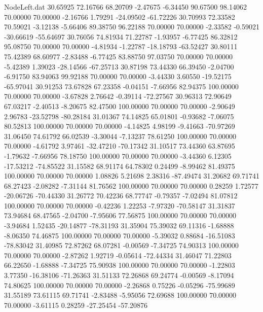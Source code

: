 \begin{filecontents}{NodeLeft.dat}
  30.65925   72.16766   68.20709    -2.47675   -6.34450   90.67500   98.14062   70.00000   70.00000   -2.16766    1.79291  -24.09502  -61.72226
  30.70993   72.33582   70.59021    -3.12138   -5.66406   89.38750   96.22188   70.00000   70.00000   -2.33582   -0.59021  -30.66619  -55.64697
  30.76056   74.81934   71.22787    -1.93957   -6.77425   86.32812   95.08750   70.00000   70.00000   -4.81934   -1.22787  -18.18793  -63.52427
  30.80111   75.42389   68.60977    -2.83488   -6.77425   83.88750   97.03750   70.00000   70.00000   -5.42389    1.39023  -28.14566  -67.25713
  30.87198   73.44330   66.39450    -2.04700   -6.91750   83.94063   99.92188   70.00000   70.00000   -3.44330    3.60550  -19.52175  -65.97041
  30.91253   73.67828   67.23358    -0.04151   -7.66956   82.94375  100.00000   70.00000   70.00000   -3.67828    2.76642   -0.39114  -72.27567
  30.96313   72.90649   67.03217    -2.40513   -8.20675   82.47500  100.00000   70.00000   70.00000   -2.90649    2.96783  -23.52798  -80.28184
  31.01367   74.14825   65.01801    -0.93682   -7.06075   80.52813  100.00000   70.00000   70.00000   -4.14825    4.98199   -9.41663  -70.97269
  31.06450   74.61792   66.02539    -3.30044   -7.13237   78.61250  100.00000   70.00000   70.00000   -4.61792    3.97461  -32.47210  -70.17342
  31.10517   73.44360   63.87695    -1.79632   -7.66956   78.18750  100.00000   70.00000   70.00000   -3.44360    6.12305  -17.53212  -74.85522
  31.15582   68.91174   64.78302     0.24499   -8.99462   81.49375  100.00000   70.00000   70.00000    1.08826    5.21698    2.38316  -87.49474
  31.20682   69.71741   68.27423    -2.08282   -7.31144   81.76562  100.00000   70.00000   70.00000    0.28259    1.72577  -20.06726  -70.44330
  31.26772   70.42236   68.77747    -0.79357   -7.02494   81.07812  100.00000   70.00000   70.00000   -0.42236    1.22253   -7.97320  -70.58147
  31.31837   73.94684   68.47565    -2.04700   -7.95606   77.56875  100.00000   70.00000   70.00000   -3.94684    1.52435  -20.14877  -78.31193
  31.35904   75.39032   69.11316    -1.68888   -8.06350   74.46875  100.00000   70.00000   70.00000   -5.39032    0.88684  -16.51083  -78.83042
  31.40985   72.87262   68.07281    -0.00569   -7.34725   74.90313  100.00000   70.00000   70.00000   -2.87262    1.92719   -0.05614  -72.44334
  31.46047   71.22803   66.22650    -1.68888   -7.34725   75.90938  100.00000   70.00000   70.00000   -1.22803    3.77350  -16.38106  -71.26363
  31.51133   72.26868   69.24774    -0.00569   -8.17094   74.80625  100.00000   70.00000   70.00000   -2.26868    0.75226   -0.05296  -75.99689
  31.55189   73.61115   69.71741    -2.83488   -5.95056   72.69688  100.00000   70.00000   70.00000   -3.61115    0.28259  -27.25454  -57.20876

\end{filecontents}
